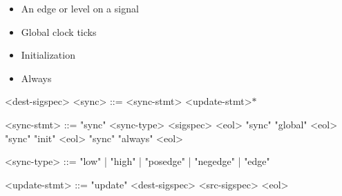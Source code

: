 \begin{itemize}
  \item An edge or level on a signal
  \item Global clock ticks
  \item Initialization
  \item Always
\end{itemize}

\begin{indentgrammar}{<dest-sigspec>}
<sync> ::= <sync-stmt> <update-stmt>$*$

<sync-stmt> ::= 
"sync" <sync-type> <sigspec> <eol>
  \alt "sync" "global" <eol>
  \alt "sync" "init" <eol>
  \alt "sync" "always" <eol>

<sync-type> ::= "low" | "high" | "posedge" | "negedge" | "edge"

<update-stmt> ::= "update" <dest-sigspec> <src-sigspec> <eol>
\end{indentgrammar}
